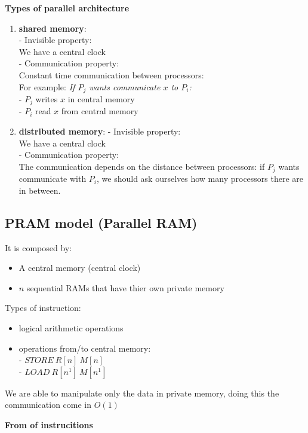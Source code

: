 \textbf{Types of parallel architecture}

\begin{enumerate}
 \item \textbf{shared memory}:\\ 
  - Invisible property:\\
   We have a central clock\\
  - Communication property:\\
   Constant time communication between processors:\\
   For example: \textit{If $P_j$ wants communicate $x$ to $P_i$:}\\
   - $P_j$ writes $x$ in central memory\\
   - $P_i$ read $x$ from central memory
 \item \textbf{distributed memory}:
  - Invisible property:\\
   We have a central clock\\
  - Communication property:\\
   The communication depends on the distance between processors: if $P_j$ wants communicate with $P_i$, we should ask ourselves how many processors there are in between.
\end{enumerate}

\subsection{PRAM model (Parallel RAM)}

It is composed by:
\begin{itemize}
 \item A central memory (central clock)
 \item $n$ sequential RAMs that have thier own private memory
\end{itemize}

Types of instruction:
\begin{itemize}
 \item logical arithmetic operations
 \item operations from/to central memory:\\
 - $STORE \ R[n] \ M[n]$\\
 - $LOAD \  R[n^1] \ M[n^1]$
\end{itemize}

We are able to manipulate only the data in private memory, doing this the communication come in $O(1)$

\textbf{From of instrucitions}

